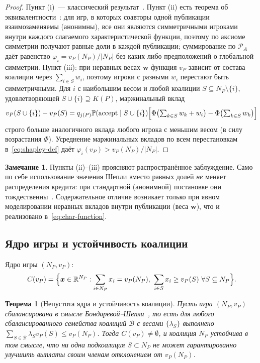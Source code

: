 \documentclass[12pt,a4paper]{article}
\newtheorem{theorem}{Теорема}
\theoremstyle{definition}
\newtheorem{remark}{Замечание}
\newcommand{\R}{\mathbb{R}}
\renewcommand{\Pr}{\mathbb{P}}
\begin{document}
\begin{proof}
  Пункт (i)~--- классический результат~\citep{shapley1953}. Пункт
  (ii) есть теорема об эквивалентности~\citep{karpov2014}: для игр, в
  которых соавторы одной публикации взаимозаменяемы (анонимны), все
  они являются симметричными игроками внутри каждого слагаемого
  характеристической функции, поэтому по аксиоме симметрии получают
  равные доли в каждой публикации; суммирование по $\mathcal{P}_A$
  даёт равенство $\varphi_i = v_P(N_P)/|N_P|$ без каких-либо
  предположений о глобальной симметрии. Пункт (iii): при неравных
  весах $\bm{w}$ функция $v_P$ зависит от состава коалиции через
  $\sum_{i \in S} w_i$, поэтому игроки с разными $w_i$ перестают быть
  симметричными. Для $i$ с наибольшим весом и любой коалиции $S
  \subseteq N_P \setminus \{i\}$, удовлетворяющей $S \cup \{i\}
  \supseteq K(P)$, маржинальный вклад
  \[
    v_P(S \cup \{i\}) - v_P(S) = q_{j(P)} \Pr(\mathrm{accept}\mid
    S\cup\{i\})\Bigl[\Phi\bigl(\textstyle\sum_{k\in S} w_k +
    w_i\bigr) - \Phi\bigl(\textstyle\sum_{k\in S} w_k\bigr)\Bigr]
  \]
  строго больше аналогичного вклада любого игрока с меньшим весом (в
  силу возрастания $\Phi$). Усреднение маржинальных вкладов по всем
  перестановкам в~\eqref{eq:shapley-def} даёт $\varphi_i(v_P) > v_P(N_P)/|N_P|$.
\end{proof}

\begin{remark}
  Пункты (ii)--(iii) проясняют распространённое заблуждение. Само по
  себе использование значения Шепли вместо равных долей \emph{не}
  меняет распределения кредита: при стандартной (анонимной)
  постановке они тождественны~\citep{karpov2014}. Содержательное
  отличие возникает только при явном моделировании неравных вкладов
  внутри публикации (веса $\bm{w}$), что и реализовано
  в~\eqref{eq:char-function}.
\end{remark}

\subsection{Ядро игры и устойчивость коалиции}

Ядро игры $(N_P, v_P)$:
\begin{equation}
  C(v_P) = \Bigl\{\bm{x} \in \R^{N_P} : \sum_{i \in N_P} x_i =
  v_P(N_P),\ \sum_{i \in S} x_i \geq v_P(S)\ \forall S \subseteq N_P \Bigr\}.
  \label{eq:core}
\end{equation}

\begin{theorem}[Непустота ядра и устойчивость коалиции]
  \label{thm:core}
  Пусть игра $(N_P, v_P)$ сбалансирована в смысле
  Бондаревой--Шепли~\citep{bondareva1963, shapley1967}, то есть для
  любого сбалансированного семейства коалиций $\mathcal{B}$ с весами
  $\{\lambda_S\}$ выполнено $\sum_{S \in \mathcal{B}} \lambda_S
  v_P(S) \leq v_P(N_P)$. Тогда $C(v_P) \neq \emptyset$, и коалиция
  $N_P$ устойчива в том смысле, что ни одна подкоалиция $S \subset
  N_P$ не может гарантированно улучшить выплаты своим членам
  отклонением от $v_P(N_P)$.
\end{theorem}
\end{document}
